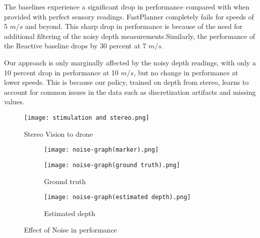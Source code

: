 The baselines experience a significant drop in performance
compared with when provided with perfect sensory readings. FastPlanner completely fails for speeds of 5 $m/s$ and beyond. This sharp
drop in performance is because of the need for additional filtering of the noisy depth measurements.Similarly, the performance of the Reactive baseline
drops by 30 percent at 7 $m/s$.

Our approach
is only marginally affected by the noisy depth readings, with only a
10 percent drop in performance at 10 $m/s$, but no change in performance at
lower speeds. This is because our policy, trained on depth from stereo,
learns to account for common issues in the data such as discretization
artifacts and missing values.

\begin{figure}[!h]
	\centering
	\texttt{[image: stimulation and stereo.png]}
	\caption{Stereo Vision to drone}
	\label{fig:sterio-vision}
\end{figure}

\begin{figure}[!h]
	\centering
	\begin{subfigure}[b]{0.75\textwidth}
		\texttt{[image: noise-graph(marker).png]}
	\end{subfigure}
	\begin{subfigure}[b]{0.48\textwidth}
		\texttt{[image: noise-graph(ground truth).png]}
		\caption{Ground truth}
	\end{subfigure}
	\begin{subfigure}[b]{0.48\textwidth}
		\texttt{[image: noise-graph(estimated depth).png]}
		\caption{Estimated depth}
	\end{subfigure}
	\caption{Effect of Noise in performance}
	\label{fig:noise-graph}
\end{figure}